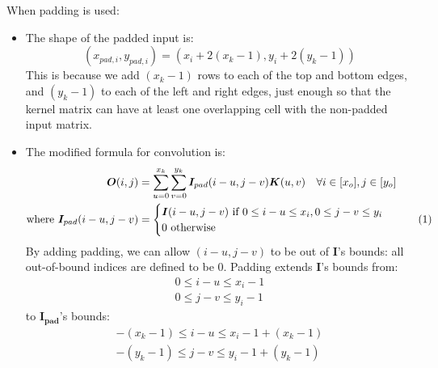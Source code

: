 \documentclass[12pt]{article}
\newcommand\numberthis{\stepcounter{equation}\tag{\theequation}}
\begin{document}
When padding is used:
\begin{itemize}
\item The shape of the padded input is:
$$(x_{pad, i}, y_{pad, i}) = (x_i + 2(x_k - 1), y_i + 2(y_k - 1))$$
This is because we add $(x_k - 1)$ rows to each of the top and bottom edges, and $(y_k - 1)$ to each of the left and right edges, just enough so that the kernel matrix can have at least one overlapping cell with the non-padded input matrix.
\item The modified formula for convolution is:
\begin{align*}
\bm{O}(i, j) &= \sum_{u = 0}^{x_k}\sum_{v = 0}^{y_k} \bm{I}_{pad}(i - u, j - v)\bm{K}(u, v) \quad \forall i \in [x_o], j \in [y_o]
\\
\text{where }
\bm{I}_{pad}(i - u, j - v) &= 
\begin{cases}
    \bm{I}(i - u, j - v) \text{ if } 0 \leq i - u \leq x_i, 0 \leq j - v \leq y_i\\
    0 \text{ otherwise}
\end{cases}
\numberthis \label{convolution_padding}
\end{align*}
By adding padding,  we can allow $(i - u, j - v)$ to be out of $\bm{I}$'s bounds: all out-of-bound indices are defined to be 0. Padding extends $\bm{I}$'s bounds from:
\begin{align*}
    0 \leq i - u \leq x_i - 1\\
    0 \leq j - v \leq y_i - 1
\end{align*}
to $\bm{I_{pad}}$'s bounds:
\begin{align*}
    -(x_k - 1) \leq i - u \leq x_i - 1 + (x_k - 1)\\
    -(y_k - 1) \leq j - v \leq y_i - 1 + (y_k - 1)
\end{align*}
\end{itemize}
\end{document}
